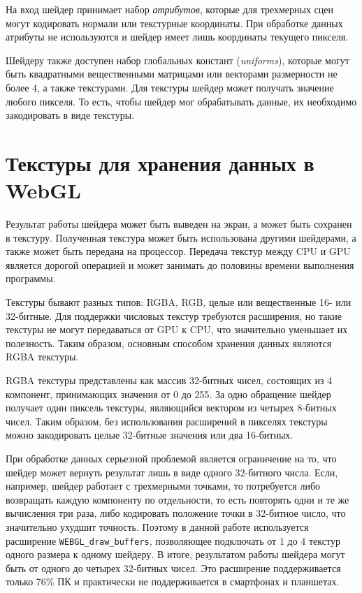 На вход шейдер принимает набор {\itshape атрибутов}, которые для трехмерных сцен могут кодировать нормали или текстурные координаты. При обработке данных атрибуты не используются и шейдер имеет лишь координаты текущего пикселя.

Шейдеру также доступен набор глобальных констант ({\itshape uniforms}), которые могут быть квадратными вещественными матрицами или векторами размерности не более 4, а также текстурами. Для текстуры шейдер может получать значение любого пикселя. То есть, чтобы шейдер мог обрабатывать данные, их необходимо закодировать в виде текстуры.

\section{Текстуры для хранения данных в WebGL}

Результат работы шейдера может быть выведен на экран, а может быть сохранен в текстуру. Полученная текстура может быть использована другими шейдерами, а также может быть передана на процессор. Передача текстур между CPU и GPU является дорогой операцией и может занимать до половины времени выполнения программы.

Текстуры бывают разных типов: RGBA, RGB, целые или вещественные 16- или 32-битные. Для поддержки числовых текстур требуются расширения, но такие текстуры не могут передаваться от GPU к CPU, что значительно уменьшает их полезность. Таким образом, основным способом хранения данных являются RGBA текстуры.

RGBA текстуры представлены как массив 32-битных чисел, состоящих из 4 компонент, принимающих значения от 0 до 255. За одно обращение шейдер получает один пиксель текстуры, являющийся вектором из четырех 8-битных чисел. Таким образом, без использования расширений в пикселях текстуры можно закодировать целые 32-битные значения или два 16-битных.

При обработке данных серьезной проблемой является ограничение на то, что шейдер может вернуть результат лишь в виде одного 32-битного числа. Если, например, шейдер работает с трехмерными точками, то потребуется либо возвращать каждую компоненту по отдельности, то есть повторять одни и те же вычисления три раза, либо кодировать положение точки в 32-битное число, что значительно ухудшит точность. Поэтому в данной работе используется расширение \texttt{WEBGL\_draw\_buffers}, позволяющее подключать от 1 до 4 текстур одного размера к одному шейдеру. В итоге, результатом работы шейдера могут быть от одного до четырех 32-битных чисел. Это расширение поддерживается только 76\% ПК и практически не поддерживается в смартфонах и планшетах.

